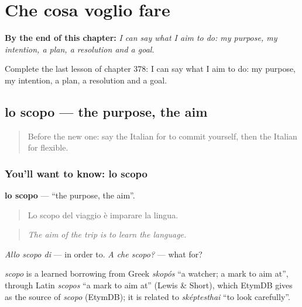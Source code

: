 
\chapter{Che cosa voglio fare}
\label{ch:it-che-cosa-voglio-fare}

\begin{chapteropening}
\textbf{By the end of this chapter:} \emph{I can say what I aim to do: my purpose, my intention, a plan, a resolution and a goal.}

Complete the last lesson of chapter 378: I can say what I aim to do: my purpose, my intention, a plan, a resolution and a goal.
\end{chapteropening}

\section[lo scopo]{lo scopo — the purpose, the aim}

\label{lesson:IT-C378-scopo}



\begin{quote}
Before the new one: say the Italian for to commit yourself, then the Italian for flexible.
\end{quote}

\subsection*{You'll want to know: lo scopo}
\textbf{lo scopo} — \textquotedblleft{}the purpose, the aim\textquotedblright{}.

\begin{quote}
Lo scopo del viaggio è imparare la lingua.
\end{quote}

\begin{quote}
\emph{The aim of the trip is to learn the language.}
\end{quote}

\emph{Allo scopo di} — in order to. \emph{A che scopo?} — what for?

\begin{cousinweb}
\emph{scopo} is a learned borrowing from Greek \emph{skopós} \textquotedblleft{}a watcher; a mark to aim at\textquotedblright{}, through Latin \emph{scopos} \textquotedblleft{}a mark to aim at\textquotedblright{} (Lewis \& Short), which EtymDB gives as the source of \emph{scopo} (EtymDB); it is related to \emph{sképtesthai} \textquotedblleft{}to look carefully\textquotedblright{}.
\end{cousinweb}

